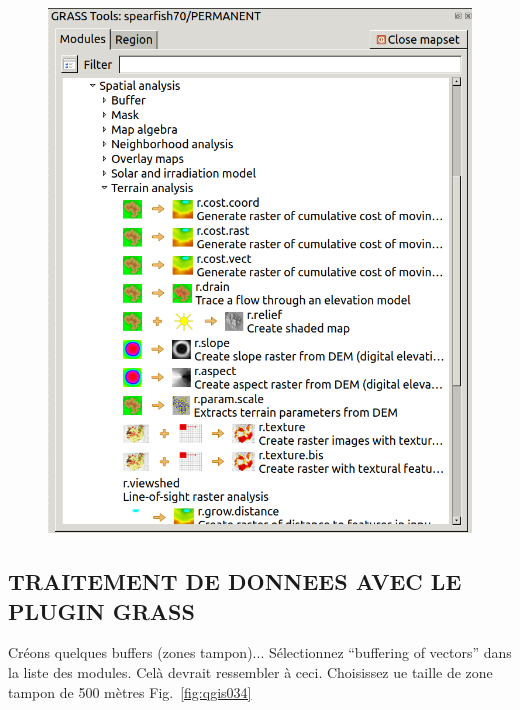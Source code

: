 \begin{figure}[htbp]
   \centering
   \includegraphics[scale=0.3]{qgis033.png}
   \caption{}
   \label{fig:qgis033}
\end{figure}

\subsection{TRAITEMENT DE DONNEES AVEC LE PLUGIN GRASS}

Cr\'eons quelques buffers (zones tampon)... S\'electionnez ``buffering of vectors'' dans la liste des modules. Cel\`a devrait ressembler \`a ceci. Choisissez ue taille de zone tampon de 500 m\`etres Fig.~\ref{fig:qgis034}

